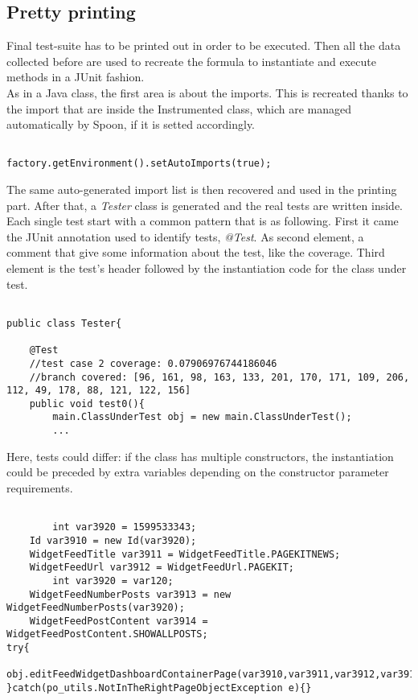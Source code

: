 \subsection{Pretty printing}\label{subsec:prettyprinting}
Final test-suite has to be printed out in order to be executed.
Then all the data collected before are used to recreate the formula to instantiate and execute methods in a JUnit fashion.\\
As in a Java class, the first area is about the imports.
This is recreated thanks to the import that are inside the Instrumented class, which are managed automatically by Spoon, if it is setted accordingly.
\begin{lstlisting}[caption={How to let Spoon automatically manage imports during class generation},label={lst:autoImportTrue}]% Start your code-block

factory.getEnvironment().setAutoImports(true);
\end{lstlisting}
The same auto-generated import list is then recovered and used in the printing part.
After that, a \emph{Tester} class is generated and the real tests are written inside.
Each single test start with a common pattern that is as following.
First it came the JUnit annotation used to identify tests, \emph{@Test}.
As second element, a comment that give some information about the test, like the coverage.
Third element is the test's header followed by the instantiation code for the class under test.
\begin{lstlisting}[caption={Example test case, first part},label={lst:testCAseFirstPart}]% Start your code-block

public class Tester{
	
	@Test
	//test case 2 coverage: 0.07906976744186046
	//branch covered: [96, 161, 98, 163, 133, 201, 170, 171, 109, 206, 112, 49, 178, 88, 121, 122, 156]
	public void test0(){
		main.ClassUnderTest obj = new main.ClassUnderTest();
		...
\end{lstlisting}
Here, tests could differ: if the class has multiple constructors, the instantiation could be preceded by extra variables depending on the constructor parameter requirements.
\begin{lstlisting}[caption={example of some possible printing cases},label={lst:printMethodComplex}]% Start your code-block

		int var3920 = 1599533343;
	Id var3910 = new Id(var3920);
	WidgetFeedTitle var3911 = WidgetFeedTitle.PAGEKITNEWS;
	WidgetFeedUrl var3912 = WidgetFeedUrl.PAGEKIT;
		int var3920 = var120;
	WidgetFeedNumberPosts var3913 = new WidgetFeedNumberPosts(var3920);
	WidgetFeedPostContent var3914 = WidgetFeedPostContent.SHOWALLPOSTS;
try{
	obj.editFeedWidgetDashboardContainerPage(var3910,var3911,var3912,var3913,var3914);
}catch(po_utils.NotInTheRightPageObjectException e){}
\end{lstlisting}

